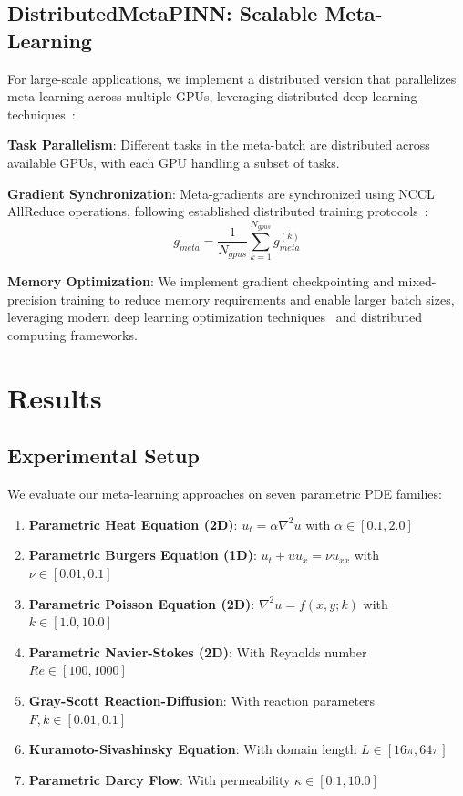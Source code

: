 \documentclass[review]{elsarticle}
\begin{document}
\subsection{DistributedMetaPINN: Scalable Meta-Learning}

For large-scale applications, we implement a distributed version that parallelizes meta-learning across multiple GPUs, leveraging distributed deep learning techniques~\cite{dean2012large,li2014scaling}:

\textbf{Task Parallelism}: Different tasks in the meta-batch are distributed across available GPUs, with each GPU handling a subset of tasks.

\textbf{Gradient Synchronization}: Meta-gradients are synchronized using NCCL AllReduce operations, following established distributed training protocols~\cite{dean2012large}:
\begin{equation}
g_{meta} = \frac{1}{N_{gpus}} \sum_{k=1}^{N_{gpus}} g_{meta}^{(k)}
\end{equation}

\textbf{Memory Optimization}: We implement gradient checkpointing and mixed-precision training to reduce memory requirements and enable larger batch sizes, leveraging modern deep learning optimization techniques~\cite{kingma2014adam,goodfellow2016deep} and distributed computing frameworks.

\section{Results}

\subsection{Experimental Setup}

We evaluate our meta-learning approaches on seven parametric PDE families:

\begin{enumerate}
\item \textbf{Parametric Heat Equation (2D)}: $u_t = \alpha \nabla^2 u$ with $\alpha \in [0.1, 2.0]$~\cite{cai2021physics}
\item \textbf{Parametric Burgers Equation (1D)}: $u_t + u u_x = \nu u_{xx}$ with $\nu \in [0.01, 0.1]$~\cite{raissi2019physics}
\item \textbf{Parametric Poisson Equation (2D)}: $\nabla^2 u = f(x,y; k)$ with $k \in [1.0, 10.0]$~\cite{berg2018unified}
\item \textbf{Parametric Navier-Stokes (2D)}: With Reynolds number $Re \in [100, 1000]$~\cite{jin2021nsfnets,rao2020physics}
\item \textbf{Gray-Scott Reaction-Diffusion}: With reaction parameters $F, k \in [0.01, 0.1]$~\cite{wight2020solving}
\item \textbf{Kuramoto-Sivashinsky Equation}: With domain length $L \in [16\pi, 64\pi]$~\cite{pathak2018model}
\item \textbf{Parametric Darcy Flow}: With permeability $\kappa \in [0.1, 10.0]$~\cite{sahli2020physics}
\end{enumerate}
\end{document}
